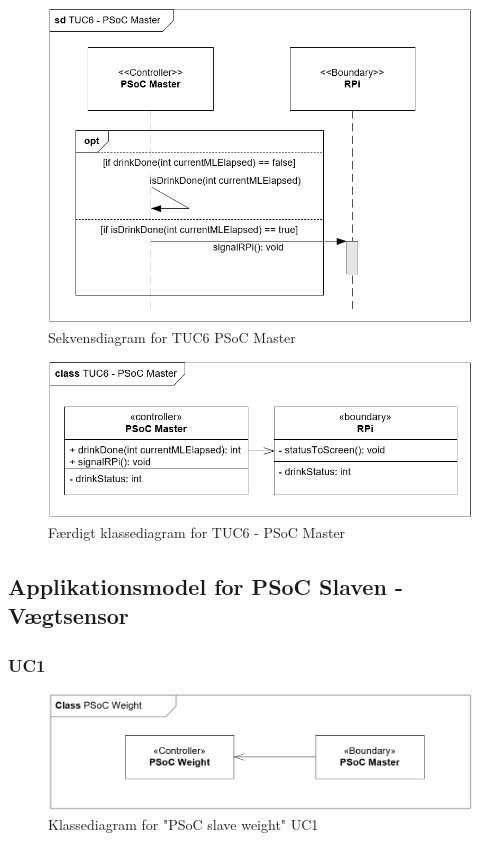 \begin{figure}[H]
	\centering
	\includegraphics[width=1\textwidth]{Images/Applikationsmodeller/PSoCMaster/PSoCMasterTUC6_Sekvensdiagram.png}
	\caption{Sekvensdiagram for TUC6 PSoC Master}
	\label{fig:sdTUC6PSoCMaster}
\end{figure}

\begin{figure}[H]
	\centering
	\includegraphics[width=1\textwidth]{Images/Applikationsmodeller/PSoCMaster/PSoCMasterTUC6_Udv_class.png}
	\caption{Færdigt klassediagram for TUC6 -  PSoC Master}
	\label{fig:cdTUC6PSoCMaster_final}
\end{figure}

\subsection{Applikationsmodel for PSoC Slaven - Vægtsensor}

\subsubsection{UC1}
\begin{figure}[H]
	\centering
	\includegraphics[width=1\textwidth]{Images/Applikationsmodeller/PSoCWeight/classAppWeightUC1.png}
	\caption{Klassediagram for "PSoC slave weight" UC1}
	\label{fig:classAppWeightUC1}
\end{figure}

